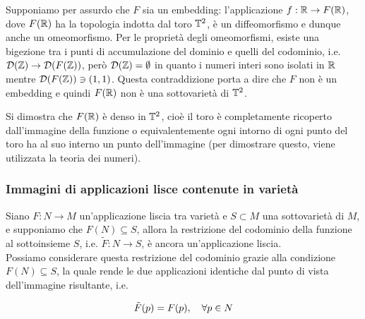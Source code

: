 Supponiamo per assurdo che $ F $ sia un embedding: l'applicazione $ f : \mathbb{R} \to F(\mathbb{R}) $, dove $ F(\mathbb{R}) $ ha la topologia indotta dal toro $ \mathbb{T}^{2} $, è un diffeomorfismo e dunque anche un omeomorfismo. Per le proprietà degli omeomorfismi, esiste una bigezione tra i punti di accumulazione del dominio e quelli del codominio, i.e. $ \mathcal{D}(\mathbb{Z}) \to \mathcal{D}(F(\mathbb{Z})) $, però $ \mathcal{D}(\mathbb{Z}) = \emptyset $ in quanto i numeri interi sono isolati in $ \mathbb{R} $ mentre $ \mathcal{D}(F(\mathbb{Z})) \ni (1,1) $. Questa contraddizione porta a dire che $ F $ non è un embedding e quindi $ F(\mathbb{R}) $ non è una sottovarietà di $ \mathbb{T}^{2} $.

\begin{remark}
	Si dimostra che $ F(\mathbb{R}) $ è denso in $ \mathbb{T}^{2} $, cioè il toro è completamente ricoperto dall'immagine della funzione o equivalentemente ogni intorno di ogni punto del toro ha al suo interno un punto dell'immagine (per dimostrare questo, viene utilizzata la teoria dei numeri).
\end{remark}

\subsubsection{Immagini di applicazioni lisce contenute in varietà}

\begin{theorem}\label{thm:smooth-restriction-subman}
	Siano $ F : N \to M $ un'applicazione liscia tra varietà e $ S \subset M $ una sottovarietà di $ M $, e supponiamo che $ F(N) \subseteq S $, allora la restrizione del codominio della funzione al sottoinsieme $ S $, i.e. $ \tilde{F} : N \to S $, è ancora un'applicazione liscia.\\
	Possiamo considerare questa restrizione del codominio grazie alla condizione $ F(N) \subseteq S $, la quale rende le due applicazioni identiche dal punto di vista dell'immagine risultante, i.e.
	
	\begin{equation}
		\tilde{F}(p) = F(p) \qcomma \forall p \in N
	\end{equation}
\end{theorem}

